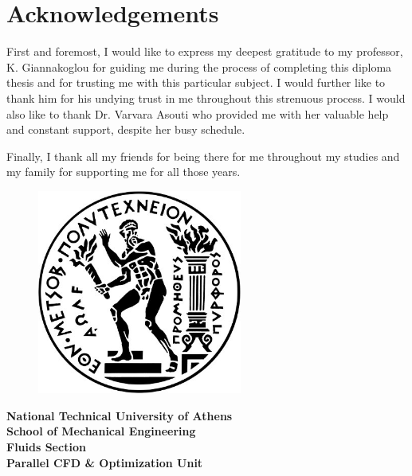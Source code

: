 \documentclass[twoside, 12pt,notitlepage]{report}
\begin{document}
\newpage

\newpage
\thispagestyle{empty}
\mbox{}
\newpage

\chapter*{Acknowledgements}

First and foremost, I would like to express my deepest gratitude to 
my professor, K. Giannakoglou for guiding me during the process of 
completing this diploma thesis and for trusting me with this 
particular subject. I would further like to thank him for his 
undying trust in me throughout this strenuous process. I would also 
like to thank Dr. Varvara Asouti who provided me with her valuable 
help and constant support, despite her busy schedule. 

Finally, I thank all my friends for being there for me throughout 
my studies and my family for supporting me for all those years.

\newpage

\newpage
\thispagestyle{empty}
\mbox{}
\newpage

\begin{figure}
\includegraphics[width=0.6\textwidth]{NTUA}
\end{figure}

\hspace{-8mm}
\textbf{National Technical University of Athens} \\
\textbf{School of Mechanical Engineering} \\
\textbf{Fluids Section} \\
\textbf{Parallel CFD \& Optimization Unit} \\
\end{document}
